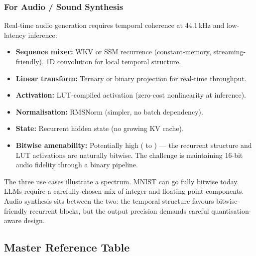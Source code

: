 \subsubsection{For Audio / Sound Synthesis}

Real-time audio generation requires temporal coherence at 44.1\,kHz
and low-latency inference:

\begin{itemize}[leftmargin=2em]
  \item \textbf{Sequence mixer:} WKV or SSM recurrence
    (constant-memory, streaming-friendly). 1D convolution for local
    temporal structure.
  \item \textbf{Linear transform:} Ternary or binary projection for
    real-time throughput.
  \item \textbf{Activation:} LUT-compiled activation (zero-cost
    nonlinearity at inference).
  \item \textbf{Normalisation:} RMSNorm (simpler, no batch dependency).
  \item \textbf{State:} Recurrent hidden state (no growing KV cache).
  \item \textbf{Bitwise amenability:} Potentially high (
    to ) --- the recurrent structure and LUT activations
    are naturally bitwise. The challenge is maintaining 16-bit audio
    fidelity through a binary pipeline.
\end{itemize}

\begin{keyinsight}
The three use cases illustrate a spectrum. MNIST can go fully bitwise
today. LLMs require a carefully chosen mix of integer and
floating-point components. Audio synthesis sits between the two:
the temporal structure favours bitwise-friendly recurrent blocks, but
the output precision demands careful quantisation-aware design.
\end{keyinsight}



\subsection{Master Reference Table}
\label{sec:master-table}

